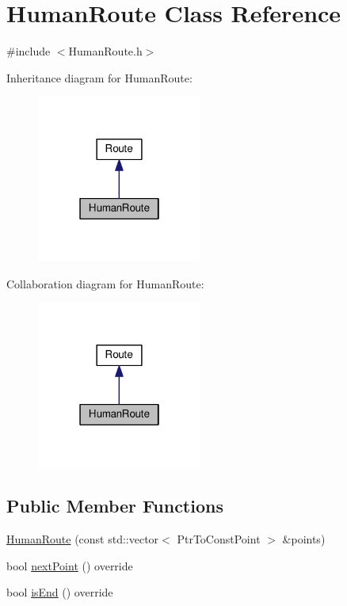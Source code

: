\hypertarget{classHumanRoute}{\section{Human\-Route Class Reference}
\label{classHumanRoute}
}


{\ttfamily \#include $<$Human\-Route.\-h$>$}



Inheritance diagram for Human\-Route\-:
\nopagebreak
\begin{figure}[H]
\begin{center}
\leavevmode
\includegraphics[width=154pt]{classHumanRoute__inherit__graph}
\end{center}
\end{figure}


Collaboration diagram for Human\-Route\-:
\nopagebreak
\begin{figure}[H]
\begin{center}
\leavevmode
\includegraphics[width=154pt]{classHumanRoute__coll__graph}
\end{center}
\end{figure}
\subsection*{Public Member Functions}
\begin{DoxyCompactItemize}
\item 
\hyperlink{classHumanRoute_a2bbf33e39be296250ae7fcf55b7cfedf}{Human\-Route} (const std\-::vector$<$ Ptr\-To\-Const\-Point $>$ \&points)
\item 
bool \hyperlink{classHumanRoute_a89c5021044b130a2928eb933111bf390}{next\-Point} () override
\item 
bool \hyperlink{classHumanRoute_aee549e955710a5217ba763d2320fb0ea}{is\-End} () override
\end{DoxyCompactItemize}


